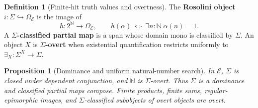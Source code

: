 \documentclass[11pt,a4paper]{article}
\numberwithin{algorithm}{section}
\numberwithin{equation}{section}
\newtheorem{proposition}[proposition]{Proposition}
\theoremstyle{definition}
\newtheorem{definition}[definition]{Definition}
\theoremstyle{remark}
\theoremstyle{plain}
\newcommand{\E}{\mathcal E}
\newcommand{\Truth}{\Omega_{\E}}
\newcommand{\N}{\mathbb N}
\newcommand{\incl}{\hookrightarrow}
\theoremstyle{definition}
\theoremstyle{plain}
\begin{document}
\begin{definition}[Finite-hit truth values and overtness]
\label{def:standalone-sigma}
The \textbf{Rosolini object} $i:\Sigma\incl\Truth$ is the image of
\[
 h:2^\N\longrightarrow\Truth,\qquad
 h(\alpha)\ \Longleftrightarrow\ \exists n:\N\;\alpha(n)=1.
\]
A \textbf{$\Sigma$-classified partial map} is a span whose domain mono is
classified by $\Sigma$. An object $X$ is \textbf{$\Sigma$-overt} when
existential quantification restricts uniformly to
$\exists_X:\Sigma^X\to\Sigma$.
\end{definition}

\begin{proposition}[Dominance and uniform natural-number search]
\label{prop:standalone-dominance}
In $\E$,
$\Sigma$ is closed under dependent conjunction, and $\N$ is
$\Sigma$-overt. Thus $\Sigma$ is a dominance and classified partial
maps compose. Finite products, finite sums, regular-epimorphic images,
and $\Sigma$-classified subobjects of overt objects are overt.
\end{proposition}
\end{document}
